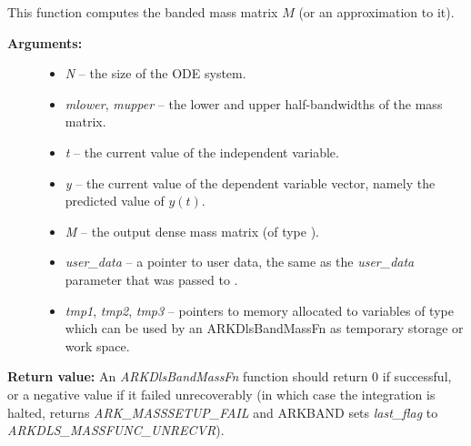 \documentclass[letterpaper,10pt,english]{sphinxmanual}
\begin{document}
\begin{fulllineitems}
\label{c_interface/User_supplied:c.ARKDlsBandMassFn}
This function computes the banded mass matrix \(M\) (or an approximation to it).
\begin{description}
\item[{\textbf{Arguments:}}] \leavevmode\begin{itemize}
\item {} 
\emph{N} -- the size of the ODE system.

\item {} 
\emph{mlower}, \emph{mupper} -- the lower and upper half-bandwidths of
the mass matrix.

\item {} 
\emph{t} -- the current value of the independent variable.

\item {} 
\emph{y} -- the current value of the dependent variable vector, namely
the predicted value of \(y(t)\).

\item {} 
\emph{M} -- the output dense mass matrix (of type ).

\item {} 
\emph{user\_data} -- a pointer to user data, the same as the
\emph{user\_data} parameter that was passed to {\hyperref[c_interface/User_callable:c.ARKodeSetUserData]{\emph{}}}.

\item {} 
\emph{tmp1}, \emph{tmp2}, \emph{tmp3} -- pointers to memory allocated to
variables of type  which can be used by an
ARKDlsBandMassFn as temporary storage or work space.

\end{itemize}

\end{description}

\textbf{Return value:}
An \emph{ARKDlsBandMassFn} function should return 0 if
successful, or a negative value if it failed unrecoverably (in
which case the integration is halted, {\hyperref[c_interface/User_callable:c.ARKode]{\emph{}}} returns
\emph{ARK\_MASSSETUP\_FAIL} and ARKBAND sets \emph{last\_flag} to
\emph{ARKDLS\_MASSFUNC\_UNRECVR}).


\end{fulllineitems}
\end{document}

